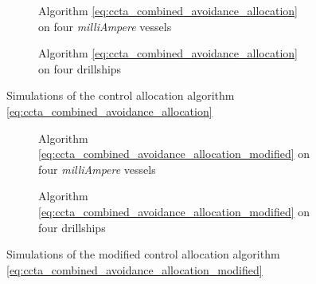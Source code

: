\begin{figure}[t]
    \centering
    \begin{subfigure}{\linewidth}
        \centering
        
        \vspace{-0.5em}
        \caption{Algorithm \eqref{eq:ccta_combined_avoidance_allocation} on four \emph{milliAmpere} vessels}
    \end{subfigure}
    \vspace{-1em}
    \begin{subfigure}{\linewidth}
        \centering
        
        \vspace{-2em}
        \caption{Algorithm \eqref{eq:ccta_combined_avoidance_allocation} on four drillships}
    \end{subfigure}
    \caption{Simulations of the control allocation algorithm \eqref{eq:ccta_combined_avoidance_allocation}}
    \label{fig:ccta_orig}
\end{figure}

\begin{figure}[t]
    \centering
    \begin{subfigure}{\linewidth}
        \centering
        
        \caption{Algorithm \eqref{eq:ccta_combined_avoidance_allocation_modified} on four \emph{milliAmpere} vessels}
        \vspace*{1em}
    \end{subfigure}
    \begin{subfigure}{\linewidth}
        \centering
        
        \caption{Algorithm \eqref{eq:ccta_combined_avoidance_allocation_modified} on four drillships}
    \end{subfigure}
    \caption{Simulations of the modified control allocation algorithm \eqref{eq:ccta_combined_avoidance_allocation_modified}}
    \label{fig:ccta_modified}
\end{figure}

